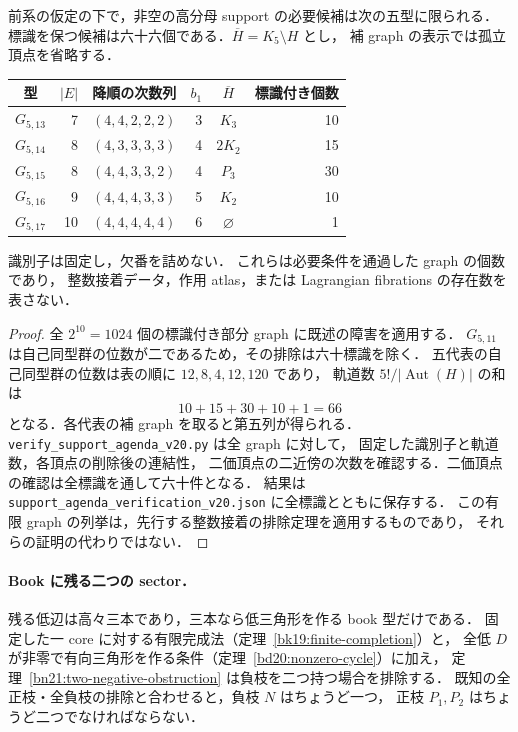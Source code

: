 \begin{corollary}[五型六十六標識への帰着]
\label{sf21:remaining-support}\label{sf20:remaining-support}
前系の仮定の下で，非空の高分母 support の必要候補は次の五型に限られる．
標識を保つ候補は六十六個である．$\overline H=K_5\setminus H$ とし，
補 graph の表示では孤立頂点を省略する．
\begin{center}\small
\begin{tabular}{crcrcr}
型&$|E|$&降順の次数列&$b_1$&$\overline H$&標識付き個数\\\hline
$G_{5,13}$&7&$(4,4,2,2,2)$&3&$K_3$&10\\
$G_{5,14}$&8&$(4,3,3,3,3)$&4&$2K_2$&15\\
$G_{5,15}$&8&$(4,4,3,3,2)$&4&$P_3$&30\\
$G_{5,16}$&9&$(4,4,4,3,3)$&5&$K_2$&10\\
$G_{5,17}$&10&$(4,4,4,4,4)$&6&$\varnothing$&1
\end{tabular}
\end{center}
識別子は固定し，欠番を詰めない．
これらは必要条件を通過した graph の個数であり，
整数接着データ，作用 atlas，または Lagrangian fibrations の存在数を表さない．
\end{corollary}

\begin{proof}
全 $2^{10}=1024$ 個の標識付き部分 graph に既述の障害を適用する．
$G_{5,11}$ は自己同型群の位数が二であるため，その排除は六十標識を除く．
五代表の自己同型群の位数は表の順に $12,8,4,12,120$ であり，
軌道数 $5!/|\operatorname{Aut}(H)|$ の和は
\[
 10+15+30+10+1=66
\]
となる．各代表の補 graph を取ると第五列が得られる．
\nolinkurl{verify_support_agenda_v20.py} は全 graph に対して，
固定した識別子と軌道数，各頂点の削除後の連結性，
二価頂点の二近傍の次数を確認する．二価頂点の確認は全標識を通して六十件となる．
結果は \nolinkurl{support_agenda_verification_v20.json} に全標識とともに保存する．
この有限 graph の列挙は，先行する整数接着の排除定理を適用するものであり，
それらの証明の代わりではない．
\end{proof}

\paragraph{Book に残る二つの sector．}
残る低辺は高々三本であり，三本なら低三角形を作る book 型だけである．
固定した一 core に対する有限完成法（定理~\ref{bk19:finite-completion}）と，
全低 $D$ が非零で有向三角形を作る条件（定理~\ref{bd20:nonzero-cycle}）に加え，
定理~\ref{bn21:two-negative-obstruction} は負枝を二つ持つ場合を排除する．
既知の全正枝・全負枝の排除と合わせると，負枝 $N$ はちょうど一つ，
正枝 $P_1,P_2$ はちょうど二つでなければならない．

